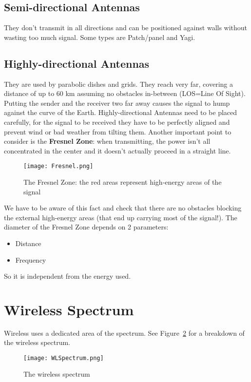 \subsection{Semi-directional Antennas} They don't transmit in all 
directions and can be positioned against walls without wasting too much signal. 
Some types are Patch/panel and Yagi.

\subsection{Highly-directional Antennas} They are used by parabolic 
dishes and grids. They reach very far, covering a distance of up to 60 km 
assuming no obstacles in-between (LOS=Line Of Sight). Putting the sender and the 
receiver two far away causes the signal to hump against the curve of the Earth. 
Highly-directional Antennas need to be placed carefully, for the signal to be 
received they have to be perfectly aligned and prevent wind or bad weather from 
tilting them.
Another important point to consider is the \textbf{Fresnel Zone}: when 
transmitting, the power isn't all concentrated in the center and it doesn't 
actually proceed in a straight line.

\begin{figure}[h]
  \centering
  \texttt{[image: Fresnel.png]}
  \caption[The Fresnel Zone]{The Fresnel Zone: the red areas represent
    high-energy areas of the signal}				
  \label{fig:ewn:Fresnel}
\end{figure}

We have to be aware of this fact and check that there are no obstacles 
blocking the external high-energy areas (that end up carrying most of the 
signal!).
The diameter of the Fresnel Zone depends on 2 parameters:
\begin{itemize}
\item Distance
\item Frequency
\end{itemize}
So it is independent from the energy used.

\section{Wireless Spectrum}
Wireless uses a dedicated area of the spectrum. See
Figure~\ref{fig:ewn:WLSpectrum} for a breakdown of the wireless spectrum.

\begin{figure}[h]
  \centering
  \texttt{[image: WLSpectrum.png]}
  \caption{The wireless spectrum}				
  \label{fig:ewn:WLSpectrum}
\end{figure}	

